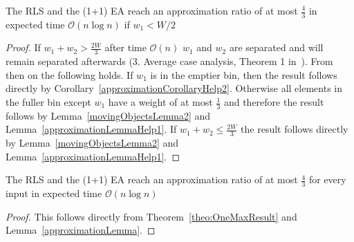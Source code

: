 \begin{lemma}\label{approximationLemma}
    The RLS and the (1+1) EA reach an approximation ratio of at most $\frac{4}{3}$ in expected time $\mathcal{O}(n\log{}n)$ if $w_1 < W/2$
\end{lemma}
\begin{proof}
    If \(w_1+w_2 > \frac{2W}{3}\) after time $\mathcal{O}(n)$ $w_1$ and $w_2$ are separated and will remain separated afterwards (3. Average case analysis, Theorem 1 in~\cite{witt2005worst}).
    From then on the following holds.
    If $w_1$ is in the emptier bin, then the result follows directly by Corollary~\ref{approximationCorollaryHelp2}.
    Otherwise all elements in the fuller bin except $w_1$ have a weight of at most $\frac{1}{3}$ and therefore the result follows by Lemma~\ref{movingObjectsLemma2} and Lemma~\ref{approximationLemmaHelp1}.
    If \(w_1+w_2 \le \frac{2W}{3}\) the result follows directly by Lemma~\ref{movingObjectsLemma2} and Lemma~\ref{approximationLemmaHelp1}.
\end{proof}

\begin{corollary}
    The RLS and the (1+1) EA reach an approximation ratio of at most $\frac{4}{3}$ for every input in expected time $\mathcal{O}(n\log{}n)$
\end{corollary}
\begin{proof}
    This follows directly from Theorem~\ref{theo:OneMaxResult} and Lemma~\ref{approximationLemma}.
\end{proof}

